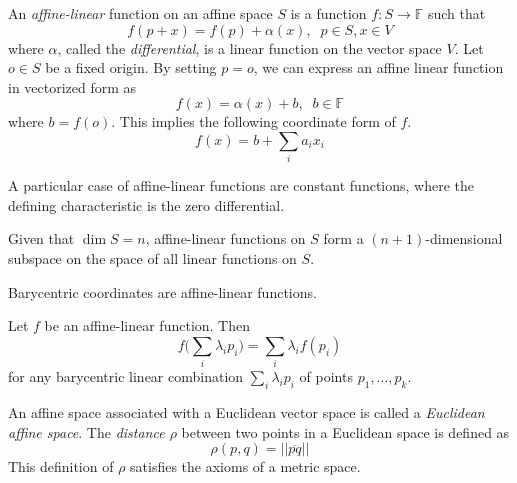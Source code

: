 \documentclass{article}
\begin{document}
    \begin{definition}
      An \textit{affine-linear} function on an affine space $S$ is a function $f: S \longrightarrow \mathbb{F}$ such that
      \begin{equation}
        f(p + x) = f(p) + \alpha (x), \;\; p \in S , x \in V
      \end{equation}
      where $\alpha$, called the \textit{differential}, is a linear function on the vector space $V$. Let $o \in S$ be a fixed origin. By setting $p = o$, we can express an affine linear function in vectorized form as 
      \begin{equation}
        f(x) = \alpha (x) + b, \;\; b \in \mathbb{F}
      \end{equation}
      where $b = f(o)$. This implies the following coordinate form of $f$. 
      \begin{equation}
        f(x) = b + \sum_i a_i x_i
      \end{equation}
    \end{definition}

    A particular case of affine-linear functions are constant functions, where the defining characteristic is the zero differential. 

    \begin{proposition}
      Given that $\dim{S} = n$, affine-linear functions on $S$ form a $(n+1)$-dimensional subspace on the space of all linear functions on $S$. 
    \end{proposition}

    \begin{proposition}
      Barycentric coordinates are affine-linear functions. 
    \end{proposition}

    \begin{proposition}
      Let $f$ be an affine-linear function. Then
      \begin{equation}
        f \bigg( \sum_i \lambda_i p_i \bigg) = \sum_i \lambda_i f(p_i)
      \end{equation}
      for any barycentric linear combination $\sum_i \lambda_i p_i$ of points $p_1, ..., p_k$. 
    \end{proposition}

    \begin{definition}
      An affine space associated with a Euclidean vector space is called a \textit{Euclidean affine space}. The \textit{distance $\rho$} between two points in a Euclidean space is defined as
      \begin{equation}
        \rho(p, q) = ||\overline{pq}||
      \end{equation}
      This definition of $\rho$ satisfies the axioms of a metric space. 
    \end{definition}
\end{document}
